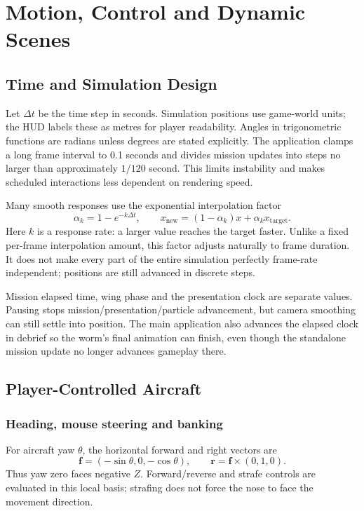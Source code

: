 \clearpage
\section{Motion, Control and Dynamic Scenes}
\subsection{Time and Simulation Design}
Let $\Delta t$ be the time step in seconds. Simulation positions use game-world units; the HUD labels these as metres for player readability. Angles in trigonometric functions are radians unless degrees are stated explicitly. The application clamps a long frame interval to 0.1 seconds and divides mission updates into steps no larger than approximately $1/120$ second. This limits instability and makes scheduled interactions less dependent on rendering speed.

Many smooth responses use the exponential interpolation factor
\begin{equation}
\alpha_k=1-e^{-k\Delta t},\qquad x_{\mathrm{new}}=(1-\alpha_k)x+\alpha_k x_{\mathrm{target}}.
\end{equation}
Here $k$ is a response rate: a larger value reaches the target faster. Unlike a fixed per-frame interpolation amount, this factor adjusts naturally to frame duration. It does not make every part of the entire simulation perfectly frame-rate independent; positions are still advanced in discrete steps.

Mission elapsed time, wing phase and the presentation clock are separate values. Pausing stops mission/presentation/particle advancement, but camera smoothing can still settle into position. The main application also advances the elapsed clock in debrief so the worm's final animation can finish, even though the standalone mission update no longer advances gameplay there.

\subsection{Player-Controlled Aircraft}
\subsubsection{Heading, mouse steering and banking}
For aircraft yaw $\theta$, the horizontal forward and right vectors are
\begin{equation}
\mathbf f=(-\sin\theta,0,-\cos\theta),\qquad
\mathbf r=\mathbf f\times(0,1,0).
\end{equation}
Thus yaw zero faces negative $Z$. Forward/reverse and strafe controls are evaluated in this local basis; strafing does not force the nose to face the movement direction.


